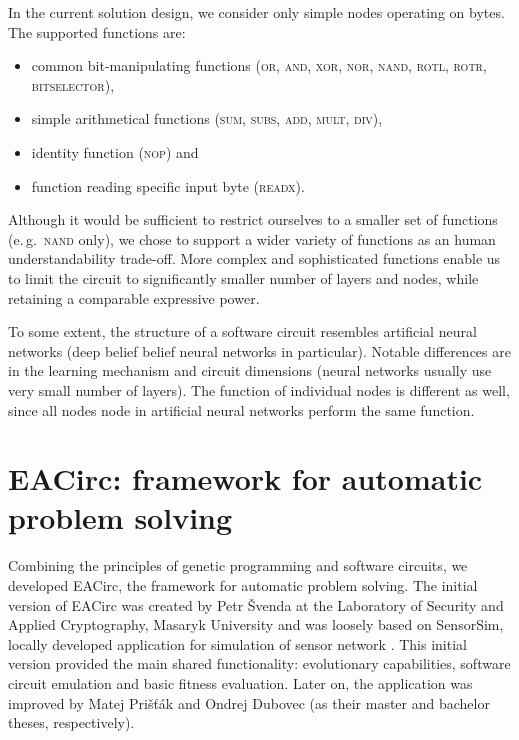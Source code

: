 \documentclass[12pt,oneside]{fithesis2}
\begin{document}
In the current solution design, we consider only simple nodes operating on bytes. The supported functions are:
\begin{itemize}
\item common bit-manipulating functions (\textsc{or, and, xor, nor, nand, rotl, rotr, bitselector}),
\item simple arithmetical functions (\textsc{sum, subs, add, mult, div}),
\item identity function (\textsc{nop}) and
\item function reading specific input byte (\textsc{readx}).
\end{itemize}

\noindent
Although it would be sufficient to restrict ourselves to a smaller set of functions (e.\,g.\ \textsc{nand} only),
we chose to support a wider variety of functions as an human understandability trade-off.
More complex and sophisticated functions enable us to limit the circuit to significantly smaller number of layers and nodes,
while retaining a comparable expressive power.

To some extent, the structure of a software circuit resembles artificial neural networks 
(deep belief belief neural networks in particular). Notable differences are in
the learning mechanism and circuit dimensions (neural networks usually use very small number of layers). 
The function of individual nodes is different as well, since all nodes node in artificial neural networks perform the same function.

\section{EACirc: framework for automatic problem solving}
\label{sec:eacirc-principles}

Combining the principles of genetic programming and software circuits, we developed EACirc, the framework for automatic
problem solving. The initial version of EACirc was created by Petr Švenda at 
the Laboratory of Security and Applied Cryptography, Masaryk University \cite{labak} and was loosely based on SensorSim,
locally developed application for simulation of sensor network \cite{sensorsim}.
This initial version provided the main shared functionality: evolutionary capabilities, software circuit emulation
and basic fitness evaluation. Later on, the application was improved by Matej Prišťák and Ondrej Dubovec 
(as their master and bachelor theses, respectively).
\end{document}

